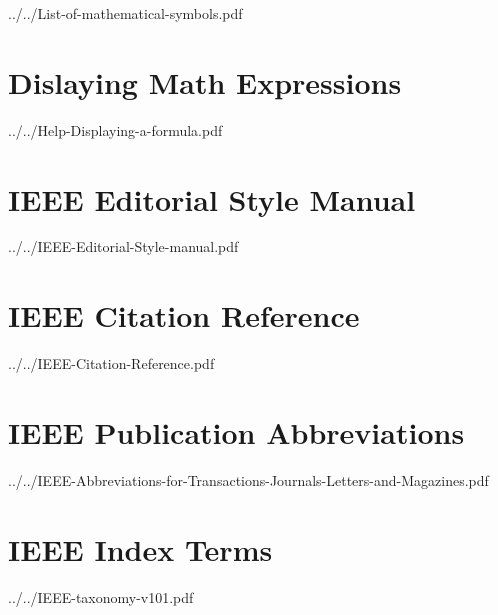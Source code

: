 
{../../List-of-mathematical-symbols.pdf}
\cleardoublepage

\chapter{Dislaying Math Expressions}
\label{ch:disp_math}


{../../Help-Displaying-a-formula.pdf}
\cleardoublepage

\chapter{IEEE Editorial Style Manual}
\label{ch:ieee_edsm}


{../../IEEE-Editorial-Style-manual.pdf}
\cleardoublepage

\chapter{IEEE Citation Reference}
\label{ch:ieee_cr}


{../../IEEE-Citation-Reference.pdf}
\cleardoublepage

\chapter{IEEE Publication Abbreviations}
\label{ch:ieee_pub_abb}


{../../IEEE-Abbreviations-for-Transactions-Journals-Letters-and-Magazines.pdf}
\cleardoublepage

\chapter{IEEE Index Terms}
\label{ch:ieee_keywords}


{../../IEEE-taxonomy-v101.pdf}
\cleardoublepage

